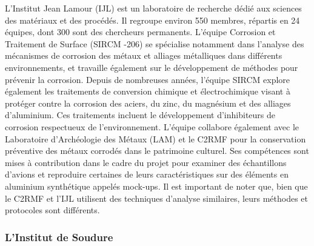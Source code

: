 L'Institut Jean Lamour (IJL) est un laboratoire de recherche dédié aux sciences des matériaux et des procédés. Il regroupe environ 550 membres, répartis en 24 équipes, dont 300 sont des chercheurs permanents. L'équipe Corrosion et Traitement de Surface (SIRCM -206) se spécialise notamment dans l'analyse des mécanismes de corrosion des métaux et alliages métalliques dans différents environnements, et travaille également sur le développement de méthodes pour prévenir la corrosion. Depuis de nombreuses années, l'équipe SIRCM explore également les traitements de conversion chimique et électrochimique visant à protéger contre la corrosion des aciers, du zinc, du magnésium et des alliages d'aluminium. Ces traitements incluent le développement d'inhibiteurs de corrosion respectueux de l'environnement. L'équipe collabore également avec le Laboratoire d'Archéologie des Métaux (LAM) et le C2RMF pour la conservation préventive des métaux corrodés dans le patrimoine culturel. Ses compétences sont mises à contribution dans le cadre du projet pour examiner des échantillons d’avions et reproduire certaines de leurs caractéristiques sur des éléments en aluminium synthétique appelés mock-ups. Il est important de noter que, bien que le C2RMF et l’IJL utilisent des techniques d’analyse similaires, leurs méthodes et protocoles sont différents. 

\subsubsection{L'Institut de Soudure}

